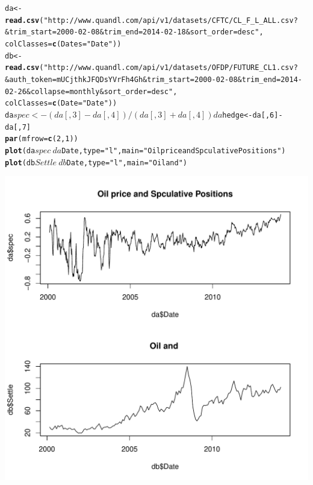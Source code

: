 \documentclass[12pt, a4paper, oneside]{article}\usepackage{graphicx, color}
\makeatletter
\def\maxwidth{ %
  \ifdim\Gin@nat@width>\linewidth
    \linewidth
  \else
    \Gin@nat@width
  \fi
}
\newcommand{\hlfunctioncall}[1]{\textcolor[rgb]{0.501960784313725,0,0.329411764705882}{\textbf{#1}}}%
\newcommand{\hlstring}[1]{\textcolor[rgb]{0.6,0.6,1}{#1}}%
\newenvironment{kframe}{%
 \def\at@end@of@kframe{}%
 \ifinner\ifhmode%
  \def\at@end@of@kframe{\end{minipage}}%
  \begin{minipage}{\columnwidth}%
 \fi\fi%
 \def\FrameCommand##1{\hskip\@totalleftmargin \hskip-\fboxsep
 \colorbox{shadecolor}{##1}\hskip-\fboxsep
     \hskip-\linewidth \hskip-\@totalleftmargin \hskip\columnwidth}%
 \MakeFramed {\advance\hsize-\width
   \@totalleftmargin\z@ \linewidth\hsize
   \@setminipage}}%
 {\par\unskip\endMakeFramed%
 \at@end@of@kframe}
\newenvironment{knitrout}{}{} %
\makeatother
\begin{document}
\begin{knitrout}
\begin{kframe}
{\ttfamily\noindent\itshape\color{messagecolor}{\#\# The following object is masked from 'package:base':\\\#\# \\\#\#\ \ \ \  as.Date, as.Date.numeric}}\begin{alltt}
da <- \hlfunctioncall{read.csv}(\hlstring{"http://www.quandl.com/api/v1/datasets/CFTC/CL_F_L_ALL.csv?&trim_start=2000-02-08&trim_end=2014-02-18&sort_order=desc"}, 
    colClasses = \hlfunctioncall{c}(Dates = \hlstring{"Date"}))
db <- \hlfunctioncall{read.csv}(\hlstring{"http://www.quandl.com/api/v1/datasets/OFDP/FUTURE_CL1.csv?&auth_token=mUCjthkJFQDsYVrFh4Gh&trim_start=2000-02-08&trim_end=2014-02-26&collapse=monthly&sort_order=desc"}, 
    colClasses = \hlfunctioncall{c}(Date = \hlstring{"Date"}))
da$spec <- (da[, 3] - da[, 4])/(da[, 3] + da[, 4])
da$hedge <- da[, 6] - da[, 7]
\hlfunctioncall{par}(mfrow = \hlfunctioncall{c}(2, 1))
\hlfunctioncall{plot}(da$spec ~ da$Date, type = \hlstring{"l"}, main = \hlstring{"Oil price and Spculative Positions"})
\hlfunctioncall{plot}(db$Settle ~ db$Date, type = \hlstring{"l"}, main = \hlstring{"Oil and "})
\end{alltt}
\end{kframe}
\includegraphics[width=\maxwidth]{figure/Oil} 
\begin{kframe}\begin{alltt}

\end{alltt}
\end{kframe}
\end{knitrout}
\end{document}
